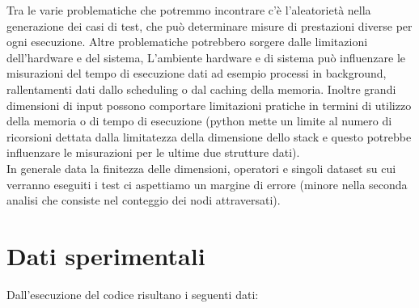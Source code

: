\documentclass{article}
\begin{document}
\noindent Tra le varie problematiche che potremmo incontrare c'è l'aleatorietà nella generazione dei casi di test, che può determinare misure di prestazioni diverse per ogni esecuzione. Altre problematiche potrebbero sorgere dalle limitazioni dell'hardware e del sistema, L'ambiente hardware e di sistema può influenzare le misurazioni del tempo di esecuzione dati ad esempio processi in background, rallentamenti dati dallo scheduling o dal caching della memoria. Inoltre grandi dimensioni di input possono comportare limitazioni pratiche in termini di utilizzo della memoria o di tempo di esecuzione (python mette un limite al numero di ricorsioni dettata dalla limitatezza della dimensione dello stack e questo potrebbe influenzare le misurazioni per le ultime due strutture dati). \\

\noindent In generale data la finitezza delle dimensioni, operatori e singoli dataset su cui verranno eseguiti i test ci aspettiamo un margine di errore (minore nella seconda analisi che consiste nel conteggio dei nodi attraversati). 

\newpage

\section*{Dati sperimentali}

\noindent Dall'esecuzione del codice risultano i seguenti dati: \\
\end{document}
